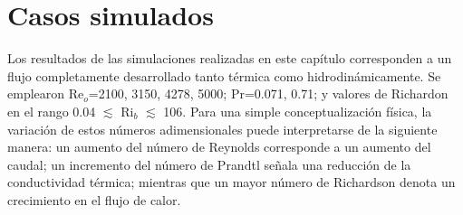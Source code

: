 
\newpage

\section{Casos simulados} 

Los resultados de las simulaciones realizadas en este capítulo corresponden a un flujo completamente desarrollado tanto térmica como hidrodinámicamente. Se emplearon Re$_o$=2100, 3150, 4278, 5000; Pr=0.071, 0.71; y valores de Richardon en el rango 0.04 $\lesssim$ Ri$_b$ $\lesssim$ 106. Para una simple conceptualización física, la variación de estos números adimensionales puede interpretarse de la siguiente manera: un aumento del número de Reynolds corresponde a un aumento del caudal; un incremento del número de Prandtl señala una reducción de la conductividad térmica; mientras que un mayor número de Richardson denota un crecimiento en el flujo de calor.

